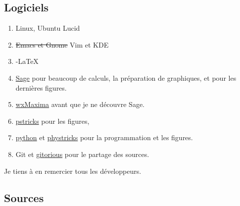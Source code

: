 \documentclass[a4paper,12pt]{book}
\theoremstyle{mes_exemples}	\newtheorem{exemple}[numtho]{Exemple}
\theoremstyle{mes_tho}
\begin{document}
\subsection{Logiciels}

\begin{enumerate}
	\item
		Linux, Ubuntu Lucid
	\item
		\st{Emacs et Gnome} Vim et KDE	%
	\item
		\AmS-\LaTeX
	\item
		\href{www.sagemath.org}{Sage} pour beaucoup de calculs, la préparation de graphiques, et pour les dernières figures.
	\item 
		\href{http://maxima.sourceforge.net/}{wxMaxima} avant que je ne découvre Sage.
	\item 
		\href{http://fr.wikipedia.org/wiki/PSTricks}{pstricks} pour les figures,
	\item
		\href{http://fr.wikipedia.org/wiki/Python_(langage)}{python} et \href{http://student.ulb.ac.be/~lclaesse/phystricks-doc.pdf}{phystricks} pour la programmation et les figures.
	\item
		Git et \href{www.gitorious.org}{gitorious} pour le partage des sources.
\end{enumerate}
Je tiens à en remercier tous les développeurs.
		
\subsection{Sources}
\end{document}
